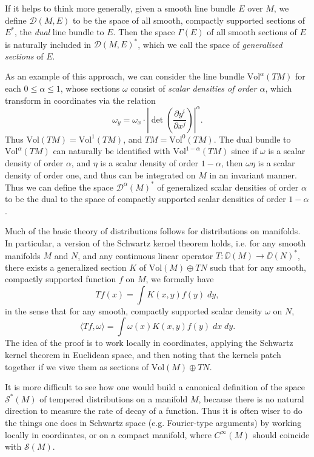 \begin{remark} 
    If it helps to think more generally, given a smooth line bundle $E$ over $M$, we define $\mathcal{D}(M,E)$ to be the space of all smooth, compactly supported sections of $E^*$, the \emph{dual} line bundle to $E$. Then the space $\Gamma(E)$ of all smooth sections of $E$ is naturally included in $\mathcal{D}(M,E)^*$, which we call the space of \emph{generalized sections} of $E$.

    As an example of this approach, we can consider the line bundle $\text{Vol}^\alpha(TM)$ for each $0 \leq \alpha \leq 1$, whose sections $\omega$ consist of \emph{scalar densities of order $\alpha$}, which transform in coordinates via the relation
    \[ \omega_y = \omega_x \cdot \left| \det \left( \frac{\partial y^i}{\partial x^j} \right) \right|^\alpha. \]
    Thus $\text{Vol}(TM) = \text{Vol}^1(TM)$, and $TM = \text{Vol}^0(TM)$. The dual bundle to $\text{Vol}^\alpha(TM)$ can naturally be identified with $\text{Vol}^{1-\alpha}(TM)$ since if $\omega$ is a scalar density of order $\alpha$, and $\eta$ is a scalar density of order $1 - \alpha$, then $\omega \eta$ is a scalar density of order one, and thus can be integrated on $M$ in an invariant manner. Thus we can define the space $\mathcal{D}^\alpha(M)^*$ of generalized scalar densities of order $\alpha$ to be the dual to the space of compactly supported scalar densities of order $1 - \alpha$.
\end{remark}

Much of the basic theory of distributions follows for distributions on manifolds. In particular, a version of the Schwartz kernel theorem holds, i.e. for any smooth manifolds $M$ and $N$, and any continuous linear operator $T: \DD(M) \to \DD(N)^*$, there exists a generalized section $K$ of $\text{Vol}(M) \oplus TN$ such that for any smooth, compactly supported function $f$ on $M$, we formally have
%
\[ Tf(x) = \int K(x,y) f(y)\; dy, \]
%
in the sense that for any smooth, compactly supported scalar density $\omega$ on $N$,
%
\[ \langle Tf, \omega \rangle = \int \omega(x) K(x,y) f(y)\; dx\; dy. \]
%
The idea of the proof is to work locally in coordinates, applying the Schwartz kernel theorem in Euclidean space, and then noting that the kernels patch together if we viwe them as sections of $\text{Vol}(M) \oplus TN$.

It is more difficult to see how one would build a canonical definition of the space $\mathcal{S}^*(M)$ of tempered distributions on a manifold $M$, because there is no natural direction to measure the rate of decay of a function. Thus it is often wiser to do the things one does in Schwartz space (e.g. Fourier-type arguments) by working locally in coordinates, or on a compact manifold, where $C^\infty(M)$ should coincide with $\mathcal{S}(M)$.

